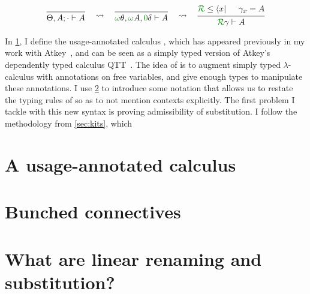 \[
  \begin{prooftree}
    \infer0{\Theta, A; {\cdot} \vdash A}
  \end{prooftree}
  \quad\rightsquigarrow\quad
  \begin{prooftree}
    \infer0{\gr\omega\theta, \gr\omega A, \gr0\delta \vdash A}
  \end{prooftree}
  \quad\rightsquigarrow\quad
  \begin{prooftree}
    \hypo{\grR \leq \bra x}
    \hypo{\gamma_x = A}
    \infer2{\grR\gamma \vdash A}
  \end{prooftree}
\]


In \cref{sec:lr}, I define the usage-annotated calculus \name{}, which has
appeared previously in my work with Atkey~\cite{WA21}, and can be seen as a
simply typed version of Atkey's dependently typed calculus QTT~\cite{Atkey18}.
The idea of \name{} is to augment simply typed $\lambda$-calculus with
annotations on free variables, and give enough types to manipulate these
annotations.
I use \cref{sec:lnd} to introduce some notation that allows us to restate the
typing rules of \name{} so as to not mention contexts explicitly.
The first problem I tackle with this new syntax is proving admissibility of
substitution.
I follow the methodology from \cref{sec:kits}, which

\section{A usage-annotated calculus}\label{sec:lr}

\section{Bunched connectives}\label{sec:lnd}

\section{What are linear renaming and substitution?}\label{sec:lrkits}

